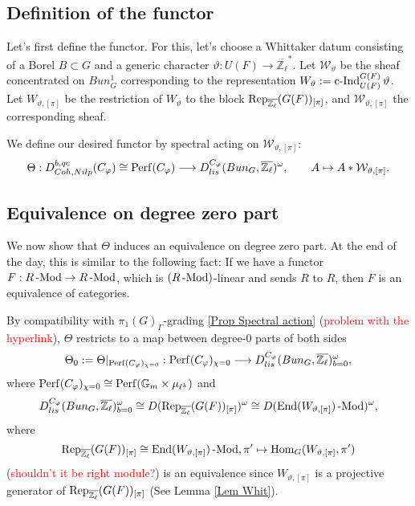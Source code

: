 \subsection{Definition of the functor}

Let's first define the functor. For this, let's choose a Whittaker datum consisting of a Borel $B \subset G$ and a generic character $\vartheta: U(F) \to \overline{\mathbb{Z}_{\ell}}^*$. Let $\mathcal{W}_{\vartheta}$ be the sheaf concentrated on $Bun_G^1$ corresponding to the representation $W_{\vartheta}:=\operatorname{\operatorname{c-Ind}}_{U(F)}^{G(F)}\vartheta$. Let $W_{\vartheta, [\pi]}$ be the restriction of $W_{\vartheta}$ to the block $\operatorname{\operatorname{Rep}}_{\overline{\mathbb{Z}_{\ell}}}(G(F))_{[\pi]}$, and $\mathcal{W}_{\vartheta, [\pi]}$ the corresponding sheaf.

We define our desired functor by spectral acting on $\mathcal{W}_{\vartheta, [\pi]}$:
$$\Theta: D^{b, qc}_{Coh, Nilp}(C_{\varphi}) \cong \operatorname{\operatorname{Perf}}(C_{\varphi}) \longrightarrow D_{lis}^{C_{\varphi}}(Bun_G, \overline{\mathbb{Z}_{\ell}})^{\omega}, \qquad A \mapsto A*\mathcal{W}_{\vartheta, [\pi]}.$$

\subsection{Equivalence on degree zero part}

We now show that $\Theta$ induces an equivalence on degree zero part. At the end of the day, this is similar to the following fact: If we have a functor $F: R\operatorname{-Mod} \to R\operatorname{-Mod}$, which is $(R\operatorname{-Mod})$-linear and sends $R$ to $R$, then $F$ is an equivalence of categories. 

By compatibility with $\pi_1(G)_{\Gamma}$-grading \ref{Prop Spectral action} (\textcolor{red}{problem with the hyperlink}), $\Theta$ restricts to a map between degree-$0$ parts of both sides
$$\Theta_0:=\Theta|_{\operatorname{\operatorname{Perf}}(C_{\varphi})_{\chi=0}}: \operatorname{\operatorname{Perf}}(C_{\varphi})_{\chi=0} \longrightarrow D_{lis}^{C_{\varphi}}(Bun_G, \overline{\mathbb{Z}_{\ell}})^{\omega}_{b=0},$$
where $\operatorname{\operatorname{Perf}}(C_{\varphi})_{\chi=0} \cong \operatorname{\operatorname{Perf}}(\mathbb{G}_m \times \mu_{\ell^k})$ and 
$$D_{lis}^{C_{\varphi}}(Bun_G, \overline{\mathbb{Z}_{\ell}})^{\omega}_{b=0} \cong D(\operatorname{\operatorname{Rep}}_{\overline{\mathbb{Z}_{\ell}}}(G(F))_{[\pi]})^{\omega} \cong D(\operatorname{\operatorname{End}}(W_{\vartheta, [\pi]})\operatorname{-Mod})^{\omega},$$
where
$$\operatorname{\operatorname{Rep}}_{\overline{\mathbb{Z}_{\ell}}}(G(F))_{[\pi]} \cong \operatorname{\operatorname{End}}(W_{\vartheta, [\pi]})\operatorname{-Mod}, \pi' \mapsto \operatorname{\operatorname{Hom}}_G(W_{\vartheta, [\pi]}, \pi')$$
(\textcolor{red}{shouldn't it be right module?}) is an equivalence since $W_{\vartheta, [\pi]}$ is a projective generator of $\operatorname{\operatorname{Rep}}_{\overline{\mathbb{Z}_{\ell}}}(G(F))_{[\pi]}$ (See Lemma \ref{Lem Whit}).

